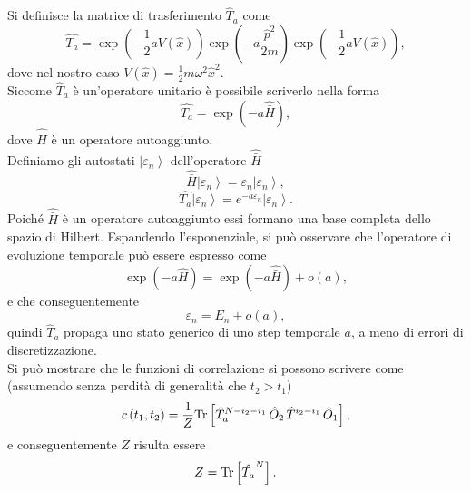 \documentclass{article}
\begin{document}
Si definisce la matrice di trasferimento $\hat{T}_a$ come 
\begin{equation}
    \hat{T_a}=\exp{\left(-\frac{1}{2}aV(\hat{x})\right)}\exp{\left(-a\frac{\hat{p}^2}{2m}\right)}\exp{\left(-\frac{1}{2}aV(\hat{x})\right)},
\end{equation}
dove nel nostro caso $V(\hat{x})=\frac{1}{2}m\omega^2\hat{x}^2$.\\
Siccome $\hat{T}_a$ è un'operatore unitario è possibile scriverlo nella forma 
\begin{equation}
    \hat{T_a}=\exp{\left(-a\hat{\bar{H}}\right)},
\end{equation}
dove $\hat{\bar{H}}$ è un operatore autoaggiunto. \\Definiamo gli autostati $\left|\varepsilon_n\right>$ dell'operatore $\hat{\bar{H}}$
\begin{equation}
    \hat{\bar{H}}\left|\varepsilon_n\right>=\varepsilon_n\left|\varepsilon_n\right>,
\end{equation}
\begin{equation}
    \label{miaomiao}
    \hat{T_a}\left|\varepsilon_n\right>=e^{-a\varepsilon_n}\left|\varepsilon_n\right>.
\end{equation} 
Poiché $\hat{\bar{H}}$ è un operatore autoaggiunto essi formano una base completa dello spazio di Hilbert. Espandendo l'esponenziale, si può osservare che l'operatore di evoluzione temporale può essere espresso come
\begin{equation}
    \exp{\left(-a\hat{H}\right)}=\exp{\left(-a\hat{\bar{H}}\right)}+o(a),
\end{equation}
e che conseguentemente
\begin{equation}
    \label{eps=E+o(a)}
    \varepsilon_n=E_n+o(a),
\end{equation}
quindi $\hat{T}_a$ propaga uno stato generico di uno step temporale $a$, a meno di errori di discretizzazione.\\
Si può mostrare che le funzioni di correlazione si possono scrivere come (assumendo senza perdità di generalità che $t_2>t_1$)
\begin{equation}
    \label{c_con_T}
    c\,(t_1,t_2)=\frac{1}{Z} \textup{Tr}\left[\hat{T}_a^{N-i_2-i_1}\,\hat{O}_2\,\hat{T}^{i_2-i_1}\,\hat{O}_1\right], 
\end{equation}
e conseguentemente $Z$ risulta essere
\begin{equation}
    \label{Z con T^N}
    Z=\textup{Tr}\left[\hat{T_a}^N\right].
\end{equation}
\end{document}
